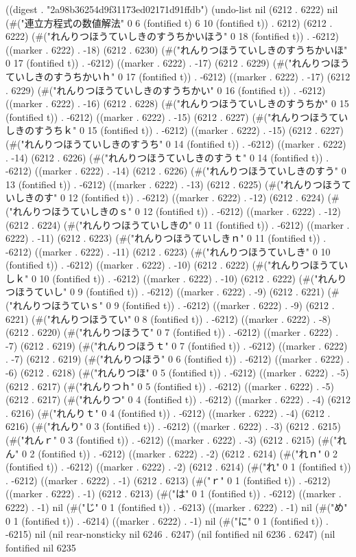 
((digest . "2a98b36254d9f31173ed02171d91ffdb") (undo-list nil (6212 . 6222) nil (#("連立方程式の数値解法" 0 6 (fontified t) 6 10 (fontified t)) . 6212) (6212 . 6222) (#("れんりつほうていしきのすうちかいほう" 0 18 (fontified t)) . -6212) ((marker . 6222) . -18) (6212 . 6230) (#("れんりつほうていしきのすうちかいほ" 0 17 (fontified t)) . -6212) ((marker . 6222) . -17) (6212 . 6229) (#("れんりつほうていしきのすうちかいｈ" 0 17 (fontified t)) . -6212) ((marker . 6222) . -17) (6212 . 6229) (#("れんりつほうていしきのすうちかい" 0 16 (fontified t)) . -6212) ((marker . 6222) . -16) (6212 . 6228) (#("れんりつほうていしきのすうちか" 0 15 (fontified t)) . -6212) ((marker . 6222) . -15) (6212 . 6227) (#("れんりつほうていしきのすうちｋ" 0 15 (fontified t)) . -6212) ((marker . 6222) . -15) (6212 . 6227) (#("れんりつほうていしきのすうち" 0 14 (fontified t)) . -6212) ((marker . 6222) . -14) (6212 . 6226) (#("れんりつほうていしきのすうｔ" 0 14 (fontified t)) . -6212) ((marker . 6222) . -14) (6212 . 6226) (#("れんりつほうていしきのすう" 0 13 (fontified t)) . -6212) ((marker . 6222) . -13) (6212 . 6225) (#("れんりつほうていしきのす" 0 12 (fontified t)) . -6212) ((marker . 6222) . -12) (6212 . 6224) (#("れんりつほうていしきのｓ" 0 12 (fontified t)) . -6212) ((marker . 6222) . -12) (6212 . 6224) (#("れんりつほうていしきの" 0 11 (fontified t)) . -6212) ((marker . 6222) . -11) (6212 . 6223) (#("れんりつほうていしきｎ" 0 11 (fontified t)) . -6212) ((marker . 6222) . -11) (6212 . 6223) (#("れんりつほうていしき" 0 10 (fontified t)) . -6212) ((marker . 6222) . -10) (6212 . 6222) (#("れんりつほうていしｋ" 0 10 (fontified t)) . -6212) ((marker . 6222) . -10) (6212 . 6222) (#("れんりつほうていし" 0 9 (fontified t)) . -6212) ((marker . 6222) . -9) (6212 . 6221) (#("れんりつほうていｓ" 0 9 (fontified t)) . -6212) ((marker . 6222) . -9) (6212 . 6221) (#("れんりつほうてい" 0 8 (fontified t)) . -6212) ((marker . 6222) . -8) (6212 . 6220) (#("れんりつほうて" 0 7 (fontified t)) . -6212) ((marker . 6222) . -7) (6212 . 6219) (#("れんりつほうｔ" 0 7 (fontified t)) . -6212) ((marker . 6222) . -7) (6212 . 6219) (#("れんりつほう" 0 6 (fontified t)) . -6212) ((marker . 6222) . -6) (6212 . 6218) (#("れんりつほ" 0 5 (fontified t)) . -6212) ((marker . 6222) . -5) (6212 . 6217) (#("れんりつｈ" 0 5 (fontified t)) . -6212) ((marker . 6222) . -5) (6212 . 6217) (#("れんりつ" 0 4 (fontified t)) . -6212) ((marker . 6222) . -4) (6212 . 6216) (#("れんりｔ" 0 4 (fontified t)) . -6212) ((marker . 6222) . -4) (6212 . 6216) (#("れんり" 0 3 (fontified t)) . -6212) ((marker . 6222) . -3) (6212 . 6215) (#("れんｒ" 0 3 (fontified t)) . -6212) ((marker . 6222) . -3) (6212 . 6215) (#("れん" 0 2 (fontified t)) . -6212) ((marker . 6222) . -2) (6212 . 6214) (#("れｎ" 0 2 (fontified t)) . -6212) ((marker . 6222) . -2) (6212 . 6214) (#("れ" 0 1 (fontified t)) . -6212) ((marker . 6222) . -1) (6212 . 6213) (#("ｒ" 0 1 (fontified t)) . -6212) ((marker . 6222) . -1) (6212 . 6213) (#("は" 0 1 (fontified t)) . -6212) ((marker . 6222) . -1) nil (#("じ" 0 1 (fontified t)) . -6213) ((marker . 6222) . -1) nil (#("め" 0 1 (fontified t)) . -6214) ((marker . 6222) . -1) nil (#("に" 0 1 (fontified t)) . -6215) nil (nil rear-nonsticky nil 6246 . 6247) (nil fontified nil 6236 . 6247) (nil fontified nil 6235 